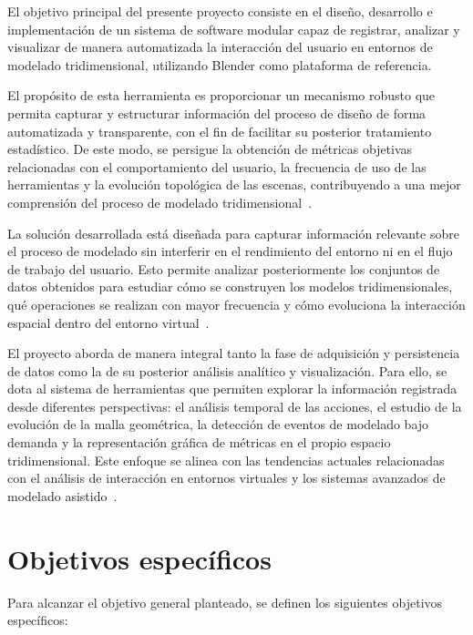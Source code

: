
El objetivo principal del presente proyecto consiste en el diseño, desarrollo e implementación de un sistema de software modular capaz de registrar, analizar y visualizar de manera automatizada la interacción del usuario en entornos de modelado tridimensional, utilizando Blender como plataforma de referencia.

El propósito de esta herramienta es proporcionar un mecanismo robusto que permita capturar y estructurar información del proceso de diseño de forma automatizada y transparente, con el fin de facilitar su posterior tratamiento estadístico. De este modo, se persigue la obtención de métricas objetivas relacionadas con el comportamiento del usuario, la frecuencia de uso de las herramientas y la evolución topológica de las escenas, contribuyendo a una mejor comprensión del proceso de modelado tridimensional~\cite{jankowski2014,lavioila2017}.

La solución desarrollada está diseñada para capturar información relevante sobre el proceso de modelado sin interferir en el rendimiento del entorno ni en el flujo de trabajo del usuario. Esto permite analizar posteriormente los conjuntos de datos obtenidos para estudiar cómo se construyen los modelos tridimensionales, qué operaciones se realizan con mayor frecuencia y cómo evoluciona la interacción espacial dentro del entorno virtual~\cite{bowman2004}.

El proyecto aborda de manera integral tanto la fase de adquisición y persistencia de datos como la de su posterior análisis analítico y visualización. Para ello, se dota al sistema de herramientas que permiten explorar la información registrada desde diferentes perspectivas: el análisis temporal de las acciones, el estudio de la evolución de la malla geométrica, la detección de eventos de modelado bajo demanda y la representación gráfica de métricas en el propio espacio tridimensional. Este enfoque se alinea con las tendencias actuales relacionadas con el análisis de interacción en entornos virtuales y los sistemas avanzados de modelado asistido~\cite{malik2023}.

\section{Objetivos específicos}

Para alcanzar el objetivo general planteado, se definen los siguientes objetivos específicos:

